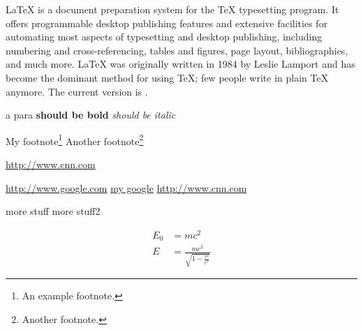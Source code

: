 \documentclass[10pt,a4paper]{article}
\begin{document}
\LaTeX{} is a document preparation system for the \TeX{}
  typesetting program. It offers programmable desktop
  publishing features and extensive facilities for
  automating most aspects of typesetting and desktop
  publishing, including numbering and cross-referencing,
  tables and figures, page layout, bibliographies, and
  much more. \LaTeX{} was originally written in 1984 by
  Leslie Lamport and has become the dominant method for
  using \TeX; few people write in plain \TeX{} anymore.
  The current version is \LaTeXe.

  \begin{flushright}
  a para
  \textbf{should be bold}
  \textit{should be italic}

  \end{flushright}



  \begin{flushleft}
  My footnote\footnote{An example footnote.}
  Another footnote\footnote{Another footnote.}

  \hyperref[cnn]{http://www.cnn.com}

  \url{http://www.google.com}
  \href{http://www.google.com}{my google}
  \href{http://www.cnn.com}{http://www.cnn.com}

  \end{flushleft}
  more stuff
  more stuff2

  \begin{align}
    E_0 &= mc^2                              \\
    E &= \frac{mc^2}{\sqrt{1-\frac{v^2}{c^2}}}
  \end{align}
\end{document}

